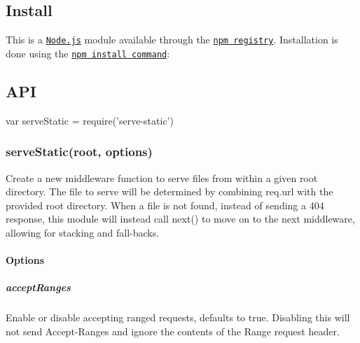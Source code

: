 \href{https://npmjs.org/package/serve-static}{\tt } \href{https://npmjs.org/package/serve-static}{\tt } \href{https://travis-ci.org/expressjs/serve-static}{\tt } \href{https://ci.appveyor.com/project/dougwilson/serve-static}{\tt } \href{https://coveralls.io/r/expressjs/serve-static}{\tt } \href{https://gratipay.com/dougwilson/}{\tt }

\subsection*{Install}

This is a \href{https://nodejs.org/en/}{\tt Node.\+js} module available through the \href{https://www.npmjs.com/}{\tt npm registry}. Installation is done using the \href{https://docs.npmjs.com/getting-started/installing-npm-packages-locally}{\tt {\ttfamily npm install} command}\+:




\subsection*{A\+PI}


\begin{DoxyCode}
var serveStatic = require('serve-static')
\end{DoxyCode}


\subsubsection*{serve\+Static(root, options)}

Create a new middleware function to serve files from within a given root directory. The file to serve will be determined by combining {\ttfamily req.\+url} with the provided root directory. When a file is not found, instead of sending a 404 response, this module will instead call {\ttfamily next()} to move on to the next middleware, allowing for stacking and fall-\/backs.

\paragraph*{Options}

\subparagraph*{accept\+Ranges}

Enable or disable accepting ranged requests, defaults to true. Disabling this will not send {\ttfamily Accept-\/\+Ranges} and ignore the contents of the {\ttfamily Range} request header.

